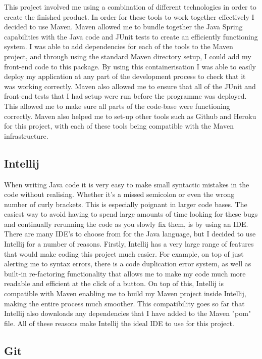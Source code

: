 This project involved me using a combination of different technologies in order to create the finished product. In order for these tools to work together effectively I decided to use Maven. Maven allowed me to bundle together the Java Spring capabilities with the Java code and JUnit tests to create an efficiently functioning system. I was able to add dependencies for each of the tools to the Maven project, and through using the standard Maven directory setup, I could add my front-end code to this package. By using this containerisation I was able to easily deploy my application at any part of the development process to check that it was working correctly. Maven also allowed me to ensure that all of the JUnit and front-end tests that I had setup were run before the programme was deployed. This allowed me to make sure all parts of the code-base were functioning correctly. Maven also helped me to set-up other tools such as Github and Heroku for this project, with each of these tools being compatible with the Maven infrastructure.

\subsection{Intellij \label{intellij}}

When writing Java code it is very easy to make small syntactic mistakes in the code without realising. Whether it's a missed semicolon or even the wrong number of curly brackets. This is especially poignant in larger code bases. The easiest way to avoid having to spend large amounts of time looking for these bugs and continually rerunning the code as you slowly fix them, is by using an IDE. There are many IDE's to choose from for the Java language, but I decided to use Intellij for a number of reasons. Firstly, Intellij has a very large range of features that would make coding this project much easier. For example, on top of just alerting me to syntax errors, there is a code duplication error system, as well as built-in re-factoring functionality that allows me to make my code much more readable and efficient at the click of a button. On top of this, Intellij is compatible with Maven enabling me to build my Maven project inside Intellij, making the entire process much smoother. This compatibility goes so far that Intellij also downloads any dependencies that I have added to the Maven "pom" file. All of these reasons make Intellij the ideal IDE to use for this project.

\subsection{Git \label{git}}


